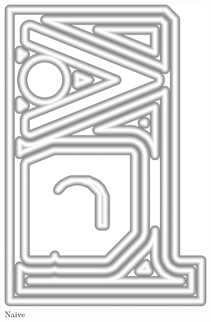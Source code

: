 \begin{figure}
\begin{subfigure}{\figwidth}
\includegraphics[height=\figheight]{sources/validation/gMAT_example/TEST_naive_widths.png}
\caption{Naive}\label{TEST_naive_accuracy}
\end{subfigure}
\begin{subfigure}{\figwidth}\centering

\end{subfigure}
\end{figure}
